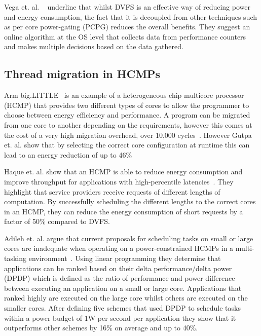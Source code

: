 Vega et. al. ~\cite{vega2013crank} underline that whilst DVFS is an effective way of reducing power and energy consumption, the fact that it is decoupled from other techniques such as per core power-gating (PCPG) reduces the overall benefits.
They suggest an online algorithm at the OS level that collects data from performance counters and makes multiple decisions based on the data gathered.
\vspace{-1em}
\subsection{Thread migration in HCMPs}
Arm big.LITTLE~\cite{armbig} is an example of a heterogeneous chip multicore processor (HCMP) that provides two different types of cores to allow the programmer to choose between energy efficiency and performance.
A program can be migrated from one core to another depending on the requirements, however this comes at the cost of a very high migration overhead, over 10,000 cycles~\cite{armbig}.
However Gutpa et. al. show that by selecting the correct core configuration at runtime this can lead to an energy reduction of up to 46\%

Haque et. al. show that an HCMP is able to reduce energy consumption and improve throughput for applications with high-percentile latencies~\cite{tailAMP2017}.
They highlight that service providers receive requests of different lengths of computation.
By successfully scheduling the different lengths to the correct cores in an HCMP, they can reduce the energy consumption of short requests by a factor of 50\% compared to DVFS.

Adileh et. al. argue that current proposals for scheduling tasks on small or large cores are inadequate when operating on a power-constrained HCMPs in a multi-tasking environment~\cite{adileh2016power}.
Using linear programming they determine that applications can be ranked based on their delta performance/delta power (DPDP) which is defined as the ratio of performance and power difference between executing an application on a small or large core.
Applications that ranked highly are executed on the large core whilst others are executed on the smaller cores.
After defining five schemes that used DPDP to schedule tasks within a power budget of 1W per second per application they show that it outperforms other schemes by 16\% on average and up to 40\%.
 
